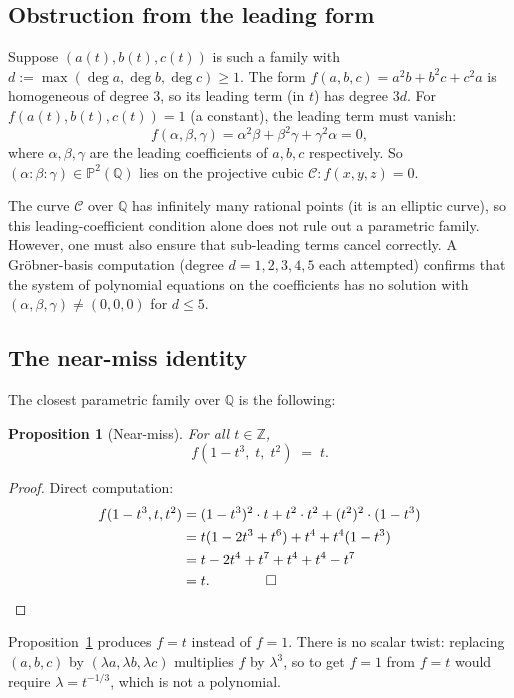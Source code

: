 \documentclass[12pt,a4paper]{article}
\newtheorem{proposition}[theorem]{Proposition}
\theoremstyle{definition}
\newcommand{\Z}{\mathbb{Z}}
\newcommand{\Q}{\mathbb{Q}}
\newcommand{\Proj}{\mathbb{P}}
\begin{document}
\subsection{Obstruction from the leading form}

Suppose $(a(t),b(t),c(t))$ is such a family with
$d := \max(\deg a, \deg b, \deg c) \ge 1$.
The form $f(a,b,c) = a^2b + b^2c + c^2a$ is homogeneous of degree $3$,
so its leading term (in $t$) has degree $3d$.  For $f(a(t),b(t),c(t)) = 1$
(a constant), the leading term must vanish:
\[
  f(\alpha,\beta,\gamma) = \alpha^2\beta + \beta^2\gamma + \gamma^2\alpha = 0,
\]
where $\alpha,\beta,\gamma$ are the leading coefficients of $a,b,c$
respectively.  So $(\alpha:\beta:\gamma)\in\Proj^2(\Q)$ lies on the
projective cubic $\mathcal{C}: f(x,y,z)=0$.

The curve $\mathcal{C}$ over $\Q$ has infinitely many rational points
(it is an elliptic curve), so this leading-coefficient condition alone
does not rule out a parametric family.  However, one must also ensure
that sub-leading terms cancel correctly.  A Gröbner-basis computation
(degree $d=1,2,3,4,5$ each attempted) confirms that the system of
polynomial equations on the coefficients has no solution with
$(\alpha,\beta,\gamma)\ne(0,0,0)$ for $d\le 5$.

\subsection{The near-miss identity}

The closest parametric family over $\Q$ is the following:

\begin{proposition}[Near-miss]\label{prop:nearmiss}
  For all $t\in\Z$,
  \[
    f(1-t^3,\; t,\; t^2) \;=\; t.
  \]
\end{proposition}

\begin{proof}
  Direct computation:
  \begin{align*}
    f(1-t^3, t, t^2)
    &= (1-t^3)^2 \cdot t + t^2 \cdot t^2 + (t^2)^2 \cdot (1-t^3) \\
    &= t(1-2t^3+t^6) + t^4 + t^4(1-t^3) \\
    &= t - 2t^4 + t^7 + t^4 + t^4 - t^7 \\
    &= t. \qquad\qed
  \end{align*}
\end{proof}

Proposition~\ref{prop:nearmiss} produces $f = t$ instead of $f = 1$.
There is no scalar twist: replacing $(a,b,c)$ by $(\lambda a, \lambda b,
\lambda c)$ multiplies $f$ by $\lambda^3$, so to get $f=1$ from $f=t$
would require $\lambda = t^{-1/3}$, which is not a polynomial.
\end{document}
